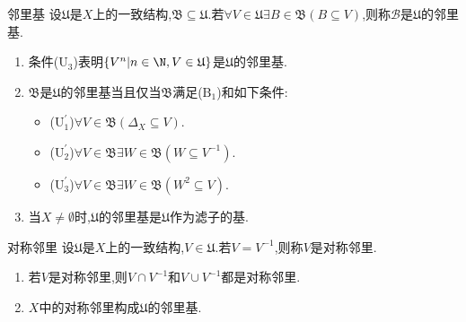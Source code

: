 \begin{definition}{邻里基}{}
	设$\mathfrak{U}$是$X$上的一致结构,$\mathfrak{B}\subseteq\mathfrak{U}$.若$\forall V\in\mathfrak{U}\exists B\in\mathfrak{B}\left(B\subseteq V\right)$,则称$\mathcal{B}$是$\mathfrak{U}$的邻里基.
\end{definition}

\begin{remark}{}{}
	\begin{enumerate}
		\item 条件($\mathrm{U}_{3}$)表明$\left\{V^{n}\middle|n\in\N,V\in\mathfrak{U}\right\}$是$\mathfrak{U}$的邻里基.
		\item $\mathfrak{B}$是$\mathfrak{U}$的邻里基当且仅当$\mathfrak{B}$满足($\mathrm{B}_{1}$)和如下条件:
		\begin{itemize}
			\item ($\mathrm{U}_{1}^{\prime}$)$\forall V\in\mathfrak{B}\left(\Delta_{X}\subseteq V\right)$.
			\item ($\mathrm{U}_{2}^{\prime}$)$\forall V\in\mathfrak{B}\exists W\in\mathfrak{B}\left(W\subseteq V^{-1}\right)$.
			\item ($\mathrm{U}_{3}^{\prime}$)$\forall V\in\mathfrak{B}\exists W\in\mathfrak{B}\left(W^{2}\subseteq V\right)$.
		\end{itemize}
		\item 当$X\neq\emptyset$时,$\mathfrak{U}$的邻里基是$\mathfrak{U}$作为滤子的基.
	\end{enumerate}
\end{remark}

\begin{definition}{对称邻里}{}
	设$\mathfrak{U}$是$X$上的一致结构,$V\in\mathfrak{U}$.若$V=V^{-1}$,则称$V$是对称邻里.
\end{definition}

\begin{remark}{}{}
	\begin{enumerate}
		\item 若$V$是对称邻里,则$V\cap V^{-1}$和$V\cup V^{-1}$都是对称邻里.
		\item $X$中的对称邻里构成$\mathfrak{U}$的邻里基.
	\end{enumerate}
\end{remark}

